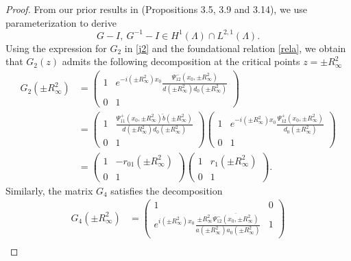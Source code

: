 \documentclass[preprint,compress,12pt]{elsarticle}
\numberwithin{equation}{section}
\begin{document}
\begin{proof}
From our prior results in \cite{Chengglo} (Propositions 3.5, 3.9 and 3.14), we use parameterization to derive
\begin{equation*}
G-I,\ G^{-1}-I\in H^{1}(\Lambda)\cap L^{2,1}(\Lambda).
\end{equation*}
Using the expression for $G_{2}$ in \eqref{j2} and the foundational relation \eqref{rela}, we obtain that $G_2(z)$ admits the following decomposition at the critical points  $z=\pm R_{\infty}^{2}$
\begin{equation*}
\begin{aligned}
G_{2}(\pm R_{\infty}^{2})
&=\begin{pmatrix}1&e^{-i(\pm R_{\infty}^{2})x_{0}}\frac{\Psi_{12}^{-}(x_{0},\pm R_{\infty}^{2})}{d(\pm R_{\infty}^{2})d_{0}(\pm R_{\infty}^{2})}\\0&1\end{pmatrix}\\
&=\begin{pmatrix}1&\frac{\Psi_{11}^{+}(x_{0},\pm R_{\infty}^{2})\breve{b}(\pm R_{\infty}^{2})}{d(\pm R_{\infty}^{2})d_{0}(\pm R_{\infty}^{2})}\\0&1\end{pmatrix}\begin{pmatrix}1&e^{-i(\pm R_{\infty}^{2})x_{0}}\frac{\Psi_{12}^{+}(x_{0},\pm R_{\infty}^{2})}{d_{0}(\pm R_{\infty}^{2})}\\0&1\end{pmatrix}\\
&=\begin{pmatrix}1&-r_{01}(\pm R_{\infty}^{2})\\0&1\end{pmatrix}\begin{pmatrix}1&r_{1}(\pm R_{\infty}^{2})\\0&1\end{pmatrix}.
\end{aligned}
\end{equation*}
 Similarly, the matrix $G_4$ satisfies the decomposition
\begin{equation*}
\begin{aligned}
G_{4}(\pm R_{\infty}^{2})
&=\begin{pmatrix}1&0\\e^{i(\pm R_{\infty}^{2})x_{0}}\frac{\pm R_{\infty}^{2}\overline{\Psi_{12}^{-}(x_{0},\pm R_{\infty}^{2})}}{a(\pm R_{\infty}^{2})a_{0}(\pm R_{\infty}^{2})}&1\end{pmatrix}\\

\end{aligned}
\end{equation*}
\end{proof}
\end{document}
